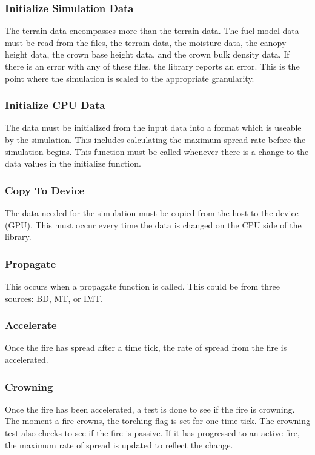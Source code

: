 \subsubsection{Initialize Simulation Data}
The terrain data encompasses more than the terrain data. The fuel model data must be read from the files, the terrain data, the moisture data, the canopy height data, the crown base height data, and the crown bulk density data. If there is an error with any of these files, the library reports an error. This is the point where the simulation is scaled to the appropriate granularity. 

\subsubsection{Initialize CPU Data}
The data must be initialized from the input data into a format which is useable by the simulation. This includes calculating the maximum spread rate before the simulation begins. This function must be called whenever there is a change to the data values in the initialize function. 

\subsubsection{Copy To Device}
The data needed for the simulation must be copied from the host to the device (GPU). This must occur every time the data is changed on the CPU side of the library. 

\subsubsection{Propagate}
This occurs when a propagate function is called. This could be from three sources: BD, MT, or IMT. 

\subsubsection{Accelerate}
Once the fire has spread after a time tick, the rate of spread from the fire is accelerated.

\subsubsection{Crowning}
Once the fire has been accelerated, a test is done to see if the fire is crowning. The moment a fire crowns, the torching flag is set for one time tick. The crowning test also checks to see if the fire is passive. If it has progressed to an active fire, the maximum rate of spread is updated to reflect the change. 

